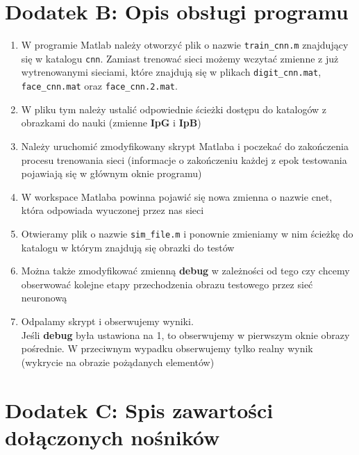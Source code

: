 \documentclass[11pt,a4paper]{article}
\begin{document}
\section{Dodatek B: Opis obsługi programu}
 \begin{enumerate}
\item W programie Matlab należy otworzyć plik o nazwie \verb#train_cnn.m# znajdujący się w katalogu \verb#cnn#. Zamiast trenować sieci możemy wczytać zmienne z już wytrenowanymi sieciami, które znajdują się w plikach \verb#digit_cnn.mat#, \verb#face_cnn.mat# oraz \verb#face_cnn.2.mat#.
\item W pliku tym należy ustalić odpowiednie ścieżki dostępu do katalogów z obrazkami do nauki (zmienne  \textbf{IpG} i  \textbf{IpB})
\item Należy uruchomić zmodyfikowany skrypt Matlaba i poczekać do zakończenia procesu trenowania sieci 
(informacje o zakończeniu każdej z epok testowania pojawiają się w głównym oknie programu)
\item W workspace Matlaba powinna pojawić się nowa zmienna o nazwie cnet, która odpowiada wyuczonej przez nas sieci
\item Otwieramy plik o nazwie \verb#sim_file.m# i ponownie zmieniamy w nim ścieżkę do katalogu w którym znajdują się
obrazki do testów
\item Można także zmodyfikować zmienną  \textbf{debug} w zależności od tego czy chcemy obserwować kolejne
 etapy przechodzenia  obrazu testowego przez sieć neuronową
\item Odpalamy skrypt i obserwujemy wyniki.\\
Jeśli \textbf{debug} była ustawiona na 1, to obserwujemy w pierwszym oknie obrazy pośrednie. W przeciwnym wypadku
obserwujemy tylko realny wynik (wykrycie na obrazie pożądanych elementów)

 \end{enumerate}
\section{Dodatek C: Spis zawartości dołączonych nośników}
\end{document}
